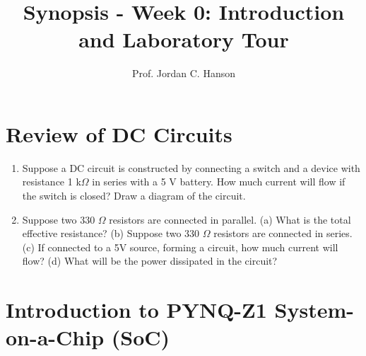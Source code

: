 \documentclass{article}
\begin{document}
\title{Synopsis - Week 0: Introduction and Laboratory Tour}
\author{Prof. Jordan C. Hanson}

\maketitle

\section{Review of DC Circuits}

\begin{enumerate}
\item Suppose a DC circuit is constructed by connecting a switch and a device with resistance 1 k$\Omega$ in series with a 5 V battery.  How much current will flow if the switch is closed?  Draw a diagram of the circuit.  \\ \vspace{1cm}
\item Suppose two 330 $\Omega$ resistors are connected in parallel.  (a) What is the total effective resistance?  (b) Suppose two 330 $\Omega$ resistors are connected in series.  (c) If connected to a 5V source, forming a circuit, how much current will flow?   (d) What will be the power dissipated in the circuit?\\ \vspace{1cm}
\end{enumerate}

\section{Introduction to PYNQ-Z1 System-on-a-Chip (SoC)}
\end{document}
